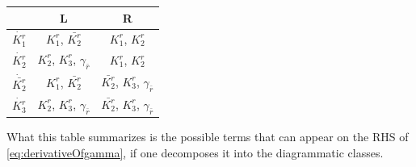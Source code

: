 \documentclass[12pt,a4paper,roman]{article}
\begin{document}
\begin{center}
\begin{tabular}{| c| | c | c|} 
\hline
          &  L & R \\ 
          \hline\hline
 $\dot{K_1^r}$  & $K_1^r$, $\bar{K_2^r}$&  $K_1^r$, $K_2^r$\\ 
 $\dot{K_2^r}$ & $K_2^r$, $K_3^r$, $\gamma_{\bar{r}}$  & $K_1^r$, $K_2^r$\\
 $\dot{\bar{K_2^r}}$ & $K_1^r$, $\bar{K_2^r}$ & $\bar{K_2^r}$, $K_3^r$, $\gamma_{\bar{r}}$\\ 
 $\dot{K_3^r}$ &  $K_2^r$, $K_3^r$, $\gamma_{\bar{r}}$   & $\bar{K_2^r}$, $K_3^r$, $\gamma_{\bar{r}}$\\
 \hline
\end{tabular}
\end{center}

What this table summarizes is the possible terms that can appear on the RHS of \ref{eq:derivativeOfgamma}, if one decomposes it into the diagrammatic classes.
\end{document}
